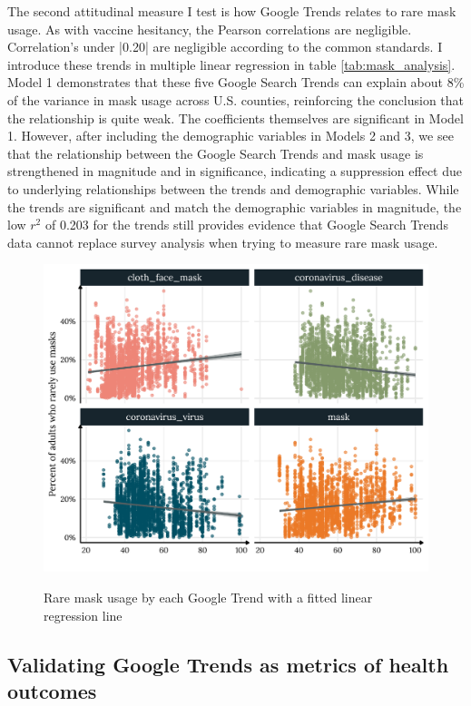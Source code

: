 The second attitudinal measure I test is how Google Trends relates to rare mask
usage. As with vaccine hesitancy, the Pearson correlations are negligible.
Correlation's under |0.20| are negligible according to the
common standards. I introduce these trends in multiple linear regression in
table \ref{tab:mask_analysis}. Model 1 demonstrates that these five Google
Search Trends can explain about 8\% of the variance in mask usage across U.S.
counties, reinforcing the conclusion that the relationship is quite weak. The
coefficients themselves are significant in Model 1. However, after
including the demographic variables in Models 2 and 3, we see that the
relationship between the Google Search Trends and mask usage is strengthened in
magnitude and in significance, indicating a suppression effect due to
underlying relationships between the trends and demographic variables. While the
trends are significant and match the demographic variables in magnitude, the
low $r^2$ of 0.203 for the trends still provides evidence that Google Search
Trends data cannot replace survey analysis when trying to measure rare mask
usage.


\begin{figure}[h]
{\centering \includegraphics[width=0.8\linewidth]{figs/paper1/mask_plot-1.pdf}}
\caption{Rare mask usage by each Google Trend with a fitted linear regression line}\label{fig:mask_plot-1}
\end{figure}


\subsection{Validating Google Trends as metrics of health outcomes}

